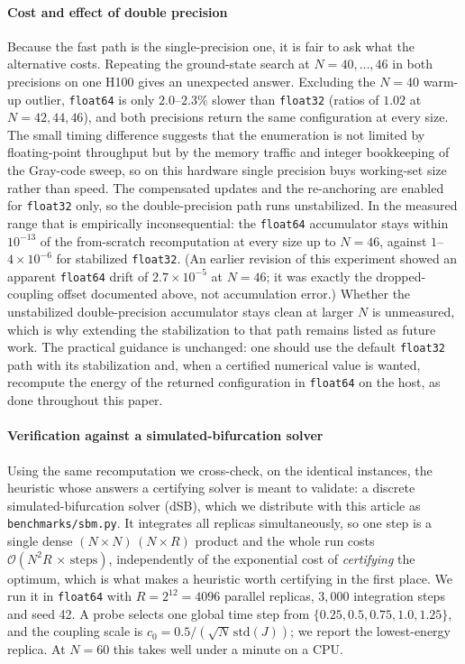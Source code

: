 \documentclass[preprint,12pt,a4paper]{elsarticle}
\begin{document}
\paragraph{Cost and effect of double precision}
Because the fast path is the single-precision one, it is fair to ask what the alternative
costs. Repeating the ground-state search at $N=40,\dots,46$ in both precisions on one H100
gives an unexpected answer. Excluding the $N=40$ warm-up outlier, \texttt{float64} is only
$2.0$--$2.3\%$ slower than \texttt{float32} (ratios of $1.02$ at
$N=42,44,46$), and both precisions return the same configuration at every size. The small timing difference suggests that the enumeration is not limited by floating-point
throughput but by the memory traffic and integer bookkeeping of the Gray-code sweep, so on
this hardware single precision buys working-set size rather than speed.
The compensated updates and the re-anchoring are enabled for \texttt{float32} only, so the
double-precision path runs unstabilized. In the measured range that is empirically
inconsequential: the \texttt{float64} accumulator stays within $10^{-13}$ of the from-scratch
recomputation at every size up to $N=46$, against $1$--$4\times 10^{-6}$ for stabilized
\texttt{float32}. (An earlier revision of this experiment showed an apparent \texttt{float64}
drift of $2.7\times 10^{-5}$ at $N=46$; it was exactly the dropped-coupling offset documented
above, not accumulation error.) Whether the unstabilized double-precision accumulator stays
clean at larger $N$ is unmeasured, which is why extending the stabilization to that path
remains listed as future work. The practical guidance is unchanged: one should use the default
\texttt{float32} path with its stabilization and, when a certified numerical value is wanted,
recompute the energy of the returned configuration in \texttt{float64} on the host, as done
throughout this paper.

\paragraph{Verification against a simulated-bifurcation solver}
Using the same recomputation we cross-check, on the identical instances, the heuristic whose
answers a certifying solver is meant to validate: a discrete simulated-bifurcation solver
(dSB), which we distribute with this article as \texttt{benchmarks/sbm.py}. It integrates all
replicas simultaneously, so one step is a single dense
$(N\!\times\!N)\,(N\!\times\!R)$ product and the whole run costs
$\mathcal{O}(N^{2}R\,\times\,\mathrm{steps})$, independently of the exponential cost of
\emph{certifying} the optimum, which is what makes a heuristic worth certifying in the first
place. We run it in \texttt{float64} with $R=2^{12}=4096$ parallel replicas, $3{,}000$
integration steps and seed 42. A probe selects one global time step from
$\{0.25,0.5,0.75,1.0,1.25\}$, and the coupling scale is
$c_0=0.5/(\sqrt{N}\,\mathrm{std}(J))$; we report the lowest-energy replica. At $N=60$ this
takes well under a minute on a CPU.
\end{document}
